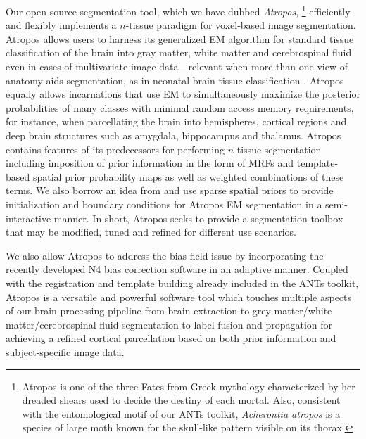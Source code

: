 \documentclass[11pt,english]{article}
\begin{document}
Our open source segmentation tool, which we have dubbed {\em
Atropos},%
\footnote{Atropos is one of the three Fates from Greek
mythology characterized by her dreaded shears used to decide the
destiny of each mortal.  Also, consistent with the entomological motif
of our ANTs toolkit, {\it Acherontia atropos} is a species of large
moth known for the skull-like pattern visible on its thorax.  }
efficiently and flexibly implements a $n$-tissue paradigm for
voxel-based image segmentation.  Atropos allows users to harness its
generalized EM algorithm for standard tissue classification of
the brain into gray matter, white matter and cerebrospinal fluid even
in cases of multivariate image data---relevant when more than one 
view of anatomy aids segmentation, as in neonatal brain tissue classification
\citep[e.g.][]{Prastawa2005,Weisenfeld2009}.  
Atropos equally allows incarnations that use EM to simultaneously
maximize the posterior probabilities of many classes with minimal
random access memory requirements, for instance,
when parcellating the brain into hemispheres, cortical regions and
deep brain structures such as amygdala, hippocampus and
thalamus.  Atropos contains features of its predecessors for
performing $n$-tissue segmentation including imposition of prior
information in the form of MRFs and template-based spatial prior
probability maps as well as weighted combinations of these terms.  We
also borrow an idea from \cite{Boykov2004} and use sparse spatial
priors to provide initialization and boundary conditions for Atropos
EM segmentation in a semi-interactive manner.  In short, Atropos seeks
to provide a segmentation toolbox that may be modified,
tuned and refined for different use scenarios.

We also allow Atropos to address the bias field issue by incorporating
the recently developed N4 bias correction software \citep{Tustison2010} in an adaptive manner.  Coupled with the
registration \citep{Avants2011} and template building 
\citep{Avants2010} already included in the ANTs toolkit, Atropos is a
versatile and powerful software tool which touches multiple aspects of
our brain processing pipeline from brain extraction
\citep{Avants2010a} to grey matter/white matter/cerebrospinal fluid
segmentation to label fusion and propagation for achieving a refined
cortical parcellation based on both prior information and
subject-specific image data.

\end{document}
